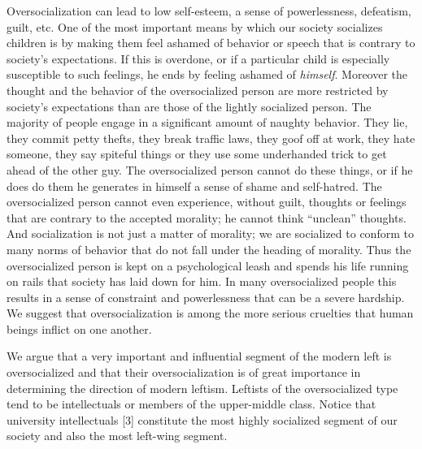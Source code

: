  Oversocialization can lead to low self-esteem, a sense of powerlessness, defeatism, guilt, etc. One of the most important means by which our society socializes children is by making them feel ashamed of behavior or speech that is contrary to society’s expectations. If this is overdone, or if a particular child is especially susceptible to such feelings, he ends by feeling ashamed of {\em himself}. Moreover the thought and the behavior of the oversocialized person are more restricted by society’s expectations than are those of the lightly socialized person. The majority of people engage in a significant amount of naughty behavior. They lie, they commit petty thefts, they break traffic laws, they goof off at work, they hate someone, they say spiteful things or they use some underhanded trick to get ahead of the other guy. The oversocialized person cannot do these things, or if he does do them he generates in himself a sense of shame and self-hatred. The oversocialized person cannot even experience, without guilt, thoughts or feelings that are contrary to the accepted morality; he cannot think “unclean” thoughts. And socialization is not just a matter of morality; we are socialized to conform to many norms of behavior that do not fall under the heading of morality. Thus the oversocialized person is kept on a psychological leash and spends his life running on rails that society has laid down for him. In many oversocialized people this results in a sense of constraint and powerlessness that can be a severe hardship. We suggest that oversocialization is among the more serious cruelties that human beings inflict on one another.

 We argue that a very important and influential segment of the modern left is oversocialized and that their oversocialization is of great importance in determining the direction of modern leftism. Leftists of the oversocialized type tend to be intellectuals or members of the upper-middle class. Notice that university intellectuals [3] constitute the most highly socialized segment of our society and also the most left-wing segment.

